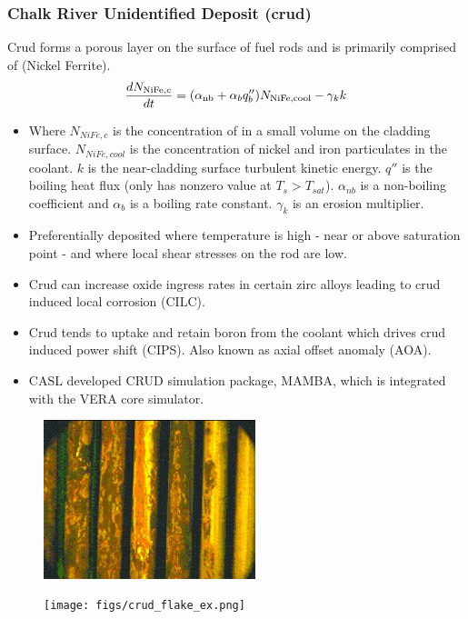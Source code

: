 \documentclass[t, pdftex]{beamer}
\begin{document}
\begin{frame}
\frametitle{Chalk River Unidentified Deposit (crud)}
\vspace{-12pt}
Crud forms a porous layer on the surface of fuel rods and is primarily comprised of  (Nickel Ferrite).
\[
    \frac{d N_{\mathrm{\ce{NiFe}},c}}{dt} = (\alpha_{\mathrm{nb}} + \alpha_{b}q''_{b} )N_{\mathrm{\ce{NiFe}}, \mathrm{cool}} - \gamma_k k
\]
\begin{tiny}
    \begin{itemize}
    \item Where $N_{NiFe,c}$ is the concentration of  in a small volume on the cladding surface. $N_{NiFe,cool}$ is the concentration of nickel and iron particulates in the coolant.  $k$ is the near-cladding surface turbulent kinetic energy.  $q''$ is the boiling heat flux (only has nonzero value at $T_s>T_{sat}$).  $\alpha_{nb}$ is a non-boiling coefficient and $\alpha_b$ is a boiling rate constant.  $\gamma_k$ is an erosion multiplier.
    \item Preferentially deposited where temperature is high - near or above saturation point - and where local shear stresses on the rod are low.
	\item Crud can increase oxide ingress rates in certain zirc alloys leading to crud induced local corrosion (CILC).
    \item Crud tends to uptake and retain boron from the coolant which drives
          crud induced power shift (CIPS). Also known as axial offset anomaly (AOA).
    \item CASL developed CRUD simulation package, MAMBA, which is integrated with the VERA core simulator.  
    \end{itemize}
\end{tiny}
\vspace{-12pt}
    \begin{figure}
        \centering
        \begin{minipage}{.5\textwidth}
            \centering
            \includegraphics[width=0.55\textwidth]{figs/crud-crud.jpg}
        \end{minipage}%
        \begin{minipage}{.5\textwidth}
            \centering
            \texttt{[image: figs/crud\_flake\_ex.png]}
        \end{minipage}
    \end{figure}
\end{frame}
\end{document}
